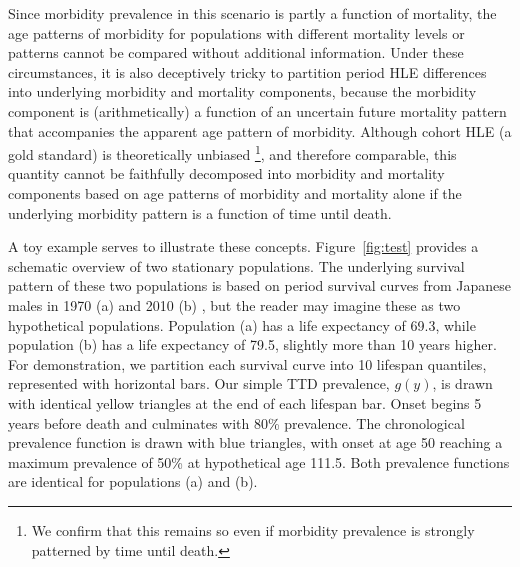 \documentclass[12pt,oneside,a4paper]{article} %
\begin{document}
Since morbidity prevalence in this scenario is partly a function of mortality,
 the age patterns of morbidity for populations with different mortality
levels or patterns cannot be compared without additional information. Under
these circumstances, it is also deceptively tricky to partition period HLE
differences into underlying morbidity and mortality components, because the
morbidity component is (arithmetically) a function of an uncertain future mortality pattern
that accompanies the apparent age pattern of morbidity. Although cohort HLE (a
gold standard) is theoretically unbiased \citep{imai2007estimation}\footnote{We confirm that this remains so even if morbidity prevalence is strongly patterned by time until death.}, and therefore comparable, this quantity cannot be faithfully
decomposed into morbidity and mortality components based on age patterns of morbidity and mortality alone if
the underlying morbidity pattern is a function of time until death.

A toy example serves to illustrate these concepts. Figure~\ref{fig:test}
provides a schematic overview of two stationary populations. The
underlying survival pattern of these two populations is based on period survival
curves from Japanese males in 1970 (a) and 2010 (b) \citep{HMD2018}, but the reader may
imagine these as two hypothetical populations. Population (a) has a life
expectancy of 69.3, while population (b) has a life expectancy of 79.5, slightly
more than 10 years higher. For demonstration, we partition each survival curve
into 10 lifespan quantiles, represented with horizontal bars. Our simple
TTD prevalence, $g(y)$, is drawn with identical yellow triangles at
the end of each lifespan bar. Onset begins 5 years before death and culminates with 80\%
prevalence. The chronological prevalence function is drawn with blue triangles,
with onset at age 50 reaching a maximum prevalence of 50\% at hypothetical age
111.5. Both prevalence functions are identical for populations (a) and (b). 
\end{document}
